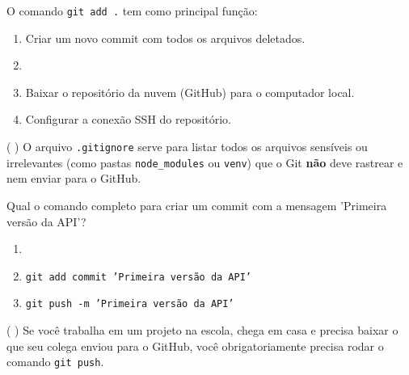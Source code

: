 \documentclass[12pt,a4paper]{article}
\newcommand{\correto}[1]{\iftoggle{gabarito}{\textbf{\color{corGabarito}#1}}{#1}}
\newcommand{\justificativa}[1]{\iftoggle{gabarito}{\vspace{0.2cm}\textbf{\color{corGabarito}Justificativa:} \color{corGabarito}#1}{\vspace{0.8cm}}}
\begin{document}
\begin{tcolorbox}[colback=white, colframe=azulTitulo, title=Questão 2]
    O comando \texttt{git add .} tem como principal função:
    \begin{enumerate}[label=\alph*)]
        \item Criar um novo commit com todos os arquivos deletados.
        \item \correto{Adicionar todas as alterações (novos arquivos, modificações e exclusões) na \textit{Staging Area}, preparando-as para o próximo commit.}
        \item Baixar o repositório da nuvem (GitHub) para o computador local.
        \item Configurar a conexão SSH do repositório.
    \end{enumerate}
\end{tcolorbox}

\begin{tcolorbox}[colback=white, colframe=azulTitulo, title=Questão 3 (V/F)]
    ( ) O arquivo \texttt{.gitignore} serve para listar todos os arquivos sensíveis ou irrelevantes (como pastas \texttt{node\_modules} ou \texttt{venv}) que o Git \textbf{não} deve rastrear e nem enviar para o GitHub.
    \justificativa{Verdadeiro.}
\end{tcolorbox}

\begin{tcolorbox}[colback=white, colframe=azulTitulo, title=Questão 4]
    Qual o comando completo para criar um commit com a mensagem 'Primeira versão da API'?
    \begin{enumerate}[label=\alph*)]
        \item \correto{\texttt{git commit -m 'Primeira versão da API'}}
        \item \texttt{git add commit 'Primeira versão da API'}
        \item \texttt{git push -m 'Primeira versão da API'}
    \end{enumerate}
\end{tcolorbox}

\begin{tcolorbox}[colback=white, colframe=azulTitulo, title=Questão 5 (V/F)]
    ( ) Se você trabalha em um projeto na escola, chega em casa e precisa baixar o que seu colega enviou para o GitHub, você obrigatoriamente precisa rodar o comando \texttt{git push}.
    \justificativa{Falso. O comando para "puxar/baixar" atualizações do repositório remoto é o \texttt{git pull}.}
\end{tcolorbox}
\end{document}

